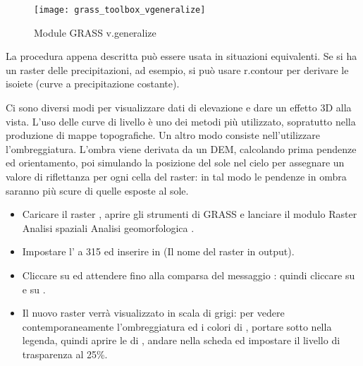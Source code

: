 \begin{figure}[h]
 \centering
 \texttt{[image: grass\_toolbox\_vgeneralize]}
 \caption{Module GRASS v.generalize \nixcaption}\label{fig:grass_toolbox_vgeneralize}
\end{figure}

\begin{Tip}\caption{\textsc{Altri usi di r.contour}}
La procedura appena descritta può essere usata in situazioni equivalenti.
Se si ha un raster delle precipitazioni, ad esempio, si può usare r.contour per 
derivare le isoiete (curve a precipitazione costante).
\end{Tip}  


Ci sono diversi modi per visualizzare dati di elevazione e dare un effetto 3D alla vista.
L'uso delle curve di livello è uno dei metodi più utilizzato, sopratutto nella 
produzione di mappe topografiche. 
Un altro modo consiste nell'utilizzare l'ombreggiatura. L'ombra viene derivata da un 
DEM, calcolando prima pendenze ed orientamento, poi simulando la posizione del sole 
nel cielo per assegnare un valore di riflettanza per ogni cella del raster: in tal modo 
le pendenze in ombra saranno più scure di quelle esposte al sole.

\begin{itemize}[label=--]
\item Caricare il raster , aprire gli strumenti di GRASS e lanciare
il modulo Raster \arrow Analisi spaziali \arrow Analisi geomorfologica \arrow {}.
\item Impostare l' a 315 ed inserire  
in  (Il nome del raster in output).
\item Cliccare su  ed attendere fino alla comparsa del messaggio 
: quindi cliccare su  
e su . 
\item Il nuovo raster verrà visualizzato in scala di grigi: per vedere contemporaneamente 
l'ombreggiatura ed i colori di , portare  
sotto  nella legenda, quindi aprire le  di 
, andare nella scheda  ed impostare il livello di 
trasparenza al 25\%. 
\end{itemize}

